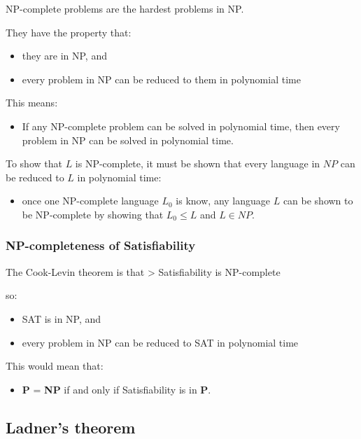 \documentclass[11pt]{article}
\providecommand{\tightlist}{%
      \setlength{\itemsep}{0pt}\setlength{\parskip}{0pt}}
\begin{document}
NP-complete problems are the hardest problems in NP.

They have the property that:

\begin{itemize}
\tightlist
\item
  they are in NP, and
\item
  every problem in NP can be reduced to them in polynomial time
\end{itemize}

This means:

\begin{itemize}
\tightlist
\item
  If any NP-complete problem can be solved in polynomial time, then
  every problem in NP can be solved in polynomial time.
\end{itemize}

To show that \(L\) is NP-complete, it must be shown that every language
in \(NP\) can be reduced to \(L\) in polynomial time:

\begin{itemize}
\tightlist
\item
  once one NP-complete language \(L_0\) is know, any language \(L\) can
  be shown to be NP-complete by showing that \(L_0 \leq L\) and
  \(L \in NP\).
\end{itemize}

    \subsubsection{NP-completeness of
Satisfiability}\label{np-completeness-of-satisfiability}

The Cook-Levin theorem is that \textgreater{} Satisfiability is
NP-complete

so:

\begin{itemize}
\tightlist
\item
  SAT is in NP, and
\item
  every problem in NP can be reduced to SAT in polynomial time
\end{itemize}

This would mean that:

\begin{itemize}
\tightlist
\item
  \textbf{P} = \textbf{NP} if and only if Satisfiability is in
  \textbf{P}.
\end{itemize}

    \subsection{Ladner's theorem}\label{ladners-theorem}
\end{document}
